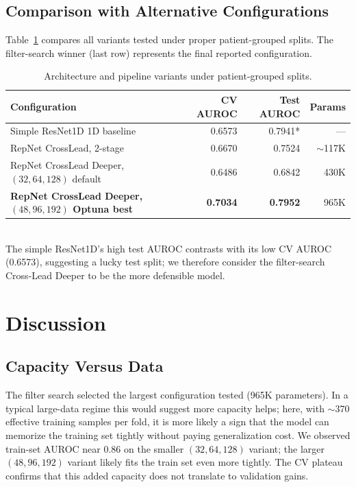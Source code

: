 \documentclass[11pt]{article}
\begin{document}
\subsection{Comparison with Alternative Configurations}

Table~\ref{tab:variants} compares all variants tested under proper patient-grouped splits. The filter-search winner (last row) represents the final reported configuration.

\begin{table}[h]
\caption{Architecture and pipeline variants under patient-grouped splits.}
\label{tab:variants}
\centering
\begin{tabular}{lrrr}
\toprule
Configuration & CV AUROC & Test AUROC & Params \\
\midrule
Simple ResNet1D 1D baseline           & 0.6573 & 0.7941* & --- \\
RepNet CrossLead, 2-stage             & 0.6670 & 0.7524  & $\sim$117K \\
RepNet CrossLead Deeper, $(32,64,128)$ default & 0.6486 & 0.6842 & 430K \\
\textbf{RepNet CrossLead Deeper, $(48,96,192)$ Optuna best} & \textbf{0.7034} & \textbf{0.7952} & 965K \\
\bottomrule
\end{tabular}
\\\vspace{1em}
\small *The simple ResNet1D's high test AUROC contrasts with its low CV AUROC (0.6573), suggesting a lucky test split; we therefore consider the filter-search Cross-Lead Deeper to be the more defensible model.
\end{table}

\section{Discussion}\label{sec:overfit}

\subsection{Capacity Versus Data}

The filter search selected the largest configuration tested (965K parameters). In a typical large-data regime this would suggest more capacity helps; here, with $\sim$370 effective training samples per fold, it is more likely a sign that the model can memorize the training set tightly without paying generalization cost. We observed train-set AUROC near 0.86 on the smaller $(32, 64, 128)$ variant; the larger $(48, 96, 192)$ variant likely fits the train set even more tightly. The CV plateau confirms that this added capacity does not translate to validation gains.
\end{document}
